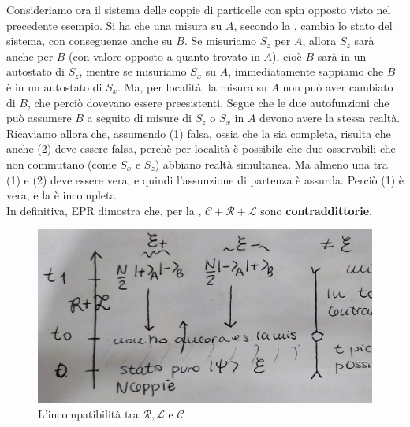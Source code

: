 \documentclass[../../FisicaTeorica.tex]{subfiles}
\begin{document}
Consideriamo ora il sistema delle coppie di particelle con spin opposto visto nel precedente esempio. Si ha che una misura su $A$, secondo la \MQ, cambia lo stato del sistema, con conseguenze anche su $B$. Se misuriamo $S_z$ per $A$, allora $S_z$ sarà  anche per $B$ (con valore opposto a quanto trovato in $A$), cioè $B$ sarà in un autostato di $S_z$, mentre se misuriamo $S_x$ su $A$, immediatamente sappiamo che $B$ è in un autostato di $S_x$. Ma, per località, la misura su $A$ non può aver cambiato  di $B$, che perciò dovevano essere preesistenti. Segue che le due autofunzioni che può assumere $B$ a seguito di misure di $S_z$ o $S_x$ in $A$ devono avere la stessa realtà.\\
Ricaviamo allora che, assumendo (1) falsa, ossia che la \MQ sia completa, risulta che anche (2) deve essere falsa, perchè per località è possibile che due osservabili che non commutano (come $S_x$ e $S_z$) abbiano realtà simultanea. Ma almeno una tra (1) e (2) deve essere vera, e quindi l'assunzione di partenza è assurda. Perciò (1) è vera, e la \MQ è incompleta.\\

In definitiva, EPR dimostra che, per la \MQ, $\mathcal{C}+\mathcal{R}+\mathcal{L}$ sono \textbf{contraddittorie}.\\
\begin{figure}[H]
\centering
\includegraphics[scale=0.4]{Immagini/19_12/image001.jpg}
\caption{L'incompatibilità tra $\mathcal{R}, \mathcal{L}$ e $\mathcal{C}$}
\end{figure}
\end{document}

